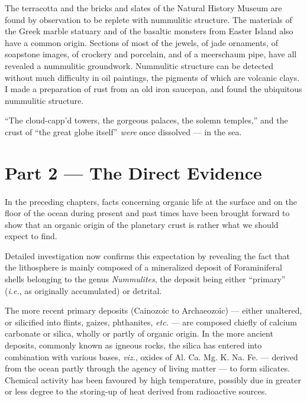 \documentclass[a4paper, 12pt, oneside]{article}
\begin{document}
The terracotta and the bricks and slates of the Natural History Museum are found by observation to be replete with nummulitic structure. The materials of the Greek marble statuary and of the basaltic monsters from Easter Island also have a common origin. Sections of most of the jewels, of jade ornaments, of soapstone images, of crockery and porcelain, and of a meerschaum pipe, have all revealed a nummulitic groundwork. Nummulitic structure can be detected without much difficulty in oil paintings, the pigments of which are volcanic clays. I made a preparation of rust from an old iron saucepan, and found the ubiquitous nummulitic structure.

``The cloud-capp'd towers, the gorgeous palaces, the solemn temples,'' and the crust of ``the great globe itself'' \emph{were} once dissolved --- in the sea.
\clearpage
\section{Part 2 --- The Direct Evidence}
\paragraph{}
In the preceding chapters, facts concerning organic life at the surface and on the floor of the ocean during present and past times have been brought forward to show that an organic origin of the planetary crust is rather what we should expect to find.

Detailed investigation now confirms this expectation by revealing the fact that the lithosphere is mainly composed of a mineralized deposit of Foraminiferal shells belonging to the genus \emph{Nummulites}, the deposit being either ``primary'' (\emph{i.e.}, as originally accumulated) or detrital.

The more recent primary deposits (Cainozoic to Archaeozoic) --- either unaltered, or silicified into flints, gaizes, phthanites, \emph{etc.} --- are composed chiefly of calcium carbonate or silica, wholly or partly of organic origin. In the more ancient deposits, commonly known as igneous rocks, the silica has entered into combination with various bases, \emph{viz.}, oxides of Al. Ca. Mg. K. Na. Fe. --- derived from the ocean partly through the agency of living matter --- to form silicates. Chemical activity has been favoured by high temperature, possibly due in greater or less degree to the storing-up of heat derived from radioactive sources.
\end{document}
